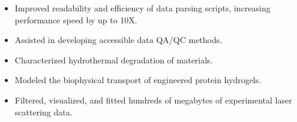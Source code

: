 \documentclass[10.9pt,letterpaper]{altacv}
\newlength{\comlogowidth}
\newcommand{\companylogo}[1]{%
	\savebox{\comlogobox}{\texttt{[image: \#1]}}%
	\settowidth{\comlogowidth}{\usebox{\comlogobox}}
}
\newcommand{\makelogospace}{\hspace*{\comlogowidth}\enspace}
\newcommand{\usecompanylogo}{\raisebox{0pt}[1em]{\usebox{\comlogobox}}\enspace}
\begin{document}
	
	\begin{fullwidth}
		\makecvheader
	\end{fullwidth}
	
	
\begin{itemize}
	\item Improved readability and efficiency of data parsing scripts, increasing performance speed by up to 10X.
	\item Assisted in developing accessible data QA/QC methods.
	\item Characterized hydrothermal degradation of materials.	
\end{itemize}
\divider	
	
	\begin{itemize}
		\item Modeled the biophysical transport of engineered protein hydrogels.
		\item Filtered, visualized, and fitted hundreds of megabytes of experimental laser scattering data.
	\end{itemize}	
	\divider
	
\end{document}
